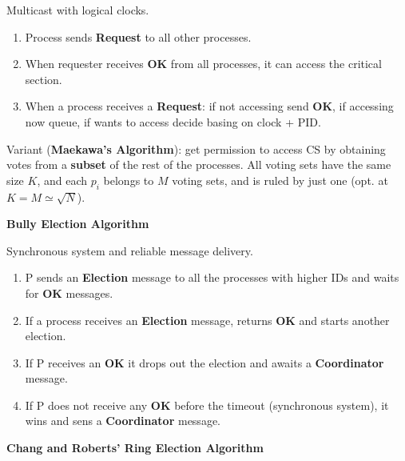 \documentclass[a4paper, 10pt, twocolumn]{article}
\begin{document}
    Multicast with logical clocks.
    \begin{enumerate}
        \item Process sends \textbf{Request} to all other processes.
        \item When requester receives \textbf{OK} from all processes, it can access the critical section.
        \item When a process receives a \textbf{Request}: if not accessing send \textbf{OK}, if accessing now queue, if wants to access decide basing on clock + PID.
    \end{enumerate}
    Variant (\textbf{Maekawa's Algorithm}): get permission to access CS by obtaining votes from a \textbf{subset} of the rest of the processes.
    All voting sets have the same size $K$, and each $p_i$ belongs to $M$ voting sets, and is ruled by just one (opt. at $K = M \simeq \sqrt{N}$).

    \textbf{Bully Election Algorithm}

    Synchronous system and reliable message delivery.
    \begin{enumerate}
        \item P sends an \textbf{Election} message to all the processes with higher IDs and waits for \textbf{OK} messages.
        \item If a process receives an \textbf{Election} message, returns \textbf{OK} and starts another election.
        \item If P receives an \textbf{OK} it drops out the election and awaits a \textbf{Coordinator} message.
        \item If P does not receive any \textbf{OK} before the timeout (synchronous system), it wins and sens a \textbf{Coordinator} message.
    \end{enumerate}

    \textbf{Chang and Roberts' Ring Election Algorithm}
\end{document}
